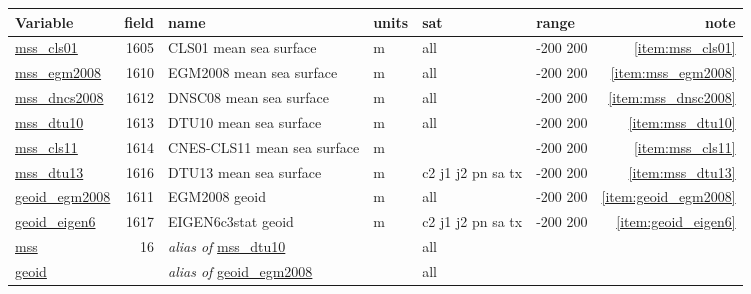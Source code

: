 \documentclass[a4paper,11pt,openany,natbib]{thesis}
\makeatletter
\newcommand\var[1]{\url{#1}\index{variables!#1@\protect\url{#1}}}
\newcommand\alias[1]{\emph{alias of} \var{#1}}
\newenvironment{vartable}{
\begin{table}[ht]
\small
\begin{tabular}{lrllllr}
\hline
Variable & field & name & units & sat & range & note \\
\hline
}{
\hline
\end{tabular}
\end{table}
}
\makeatother
\begin{document}
\begin{vartable}
\var{mss_cls01} & 1605 & CLS01 mean sea surface & m & all & -200 200 & \ref{item:mss_cls01} \\
\var{mss_egm2008} & 1610 & EGM2008 mean sea surface & m & all & -200 200 & \ref{item:mss_egm2008} \\
\var{mss_dncs2008} & 1612 & DNSC08 mean sea surface & m & all & -200 200 & \ref{item:mss_dnsc2008} \\
\var{mss_dtu10} & 1613 & DTU10 mean sea surface & m & all & -200 200 & \ref{item:mss_dtu10} \\
\var{mss_cls11} & 1614 & {CNES-CLS11} mean sea surface & m &  & -200 200 & \ref{item:mss_cls11} \\
\var{mss_dtu13} & 1616 & DTU13 mean sea surface & m & c2 j1 j2 pn sa tx & -200 200 & \ref{item:mss_dtu13} \\
\var{geoid_egm2008} & 1611 & EGM2008 geoid & m & all & -200 200 & \ref{item:geoid_egm2008} \\ 
\var{geoid_eigen6} & 1617 & EIGEN6c3stat geoid & m & c2 j1 j2 pn sa tx & -200 200 & \ref{item:geoid_eigen6} \\
\hline
\var{mss} & 16 & \alias{mss_dtu10} && all && \\
\var{geoid} && \alias{geoid_egm2008} && all && \\
\end{vartable}
\end{document}
